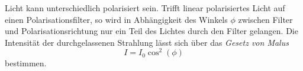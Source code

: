 Licht kann unterschiedlich polarisiert sein. Trifft linear polarisiertes Licht auf einen Polarisationsfilter, so wird in Abhängigkeit des Winkels $\phi$ zwischen Filter und Polarisationsrichtung nur ein Teil des Lichtes durch den Filter gelangen. Die Intensität der durchgelassenen Strahlung lässt sich über das \textit{Gesetz von Malus}
\begin{equation}
    \label{eqn:pol}
    I = I_0\cos^2{(\phi)}
\end{equation}
bestimmen.


